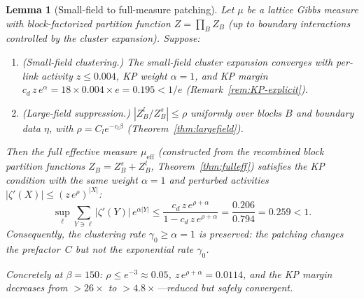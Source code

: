 \documentclass[11pt]{article}
\newtheorem{lemma}[theorem]{Lemma}
\theoremstyle{definition}
\begin{document}
\begin{lemma}[Small-field to full-measure patching]%
\label{lem:patch}
Let $\mu$ be a lattice Gibbs measure with block-factorized
partition function $Z=\prod_B Z_B$ (up to boundary
interactions controlled by the cluster expansion).  Suppose:
\begin{enumerate}[nosep,label=(\roman*)]
\item \emph{(Small-field clustering.)}  The small-field
cluster expansion converges with per-link activity $z\le 0.004$,
KP weight $\alpha=1$, and KP margin
$c_d\,z\,e^\alpha=18\times 0.004\times e=0.195<1/e$
(Remark~\ref{rem:KP-explicit}).
\item \emph{(Large-field suppression.)}
$|Z_B^l/Z_B^s|\le\rho$ uniformly over blocks $B$ and
boundary data $\eta$, with $\rho=C_l e^{-c_l\beta}$
(Theorem~\ref{thm:largefield}).
\end{enumerate}
Then the full effective measure $\mu_{\mathrm{eff}}$
(constructed from the recombined block partition functions
$Z_B=Z_B^s+Z_B^l$, Theorem~\ref{thm:fulleff}) satisfies the
KP condition with the \emph{same} weight $\alpha=1$ and
perturbed activities $|\zeta'(X)|\le(z\,e^\rho)^{|X|}$:
\begin{equation}\label{eq:KP-perturbed}
\sup_\ell\sum_{Y\ni\ell}|\zeta'(Y)|\,e^{\alpha|Y|}
\le\frac{c_d\,z\,e^{\rho+\alpha}}{1-c_d\,z\,e^{\rho+\alpha}}
=\frac{0.206}{0.794}=0.259<1.
\end{equation}
Consequently, the clustering rate $\gamma_0\ge\alpha=1$
is \emph{preserved}: the patching changes the prefactor~$C$
but not the exponential rate $\gamma_0$.

Concretely at $\beta=150$: $\rho\le e^{-3}\approx 0.05$,
$z\,e^{\rho+\alpha}=0.0114$, and the KP margin decreases
from $>26\times$ to $>4.8\times$---reduced but safely
convergent.
\end{lemma}
\end{document}
